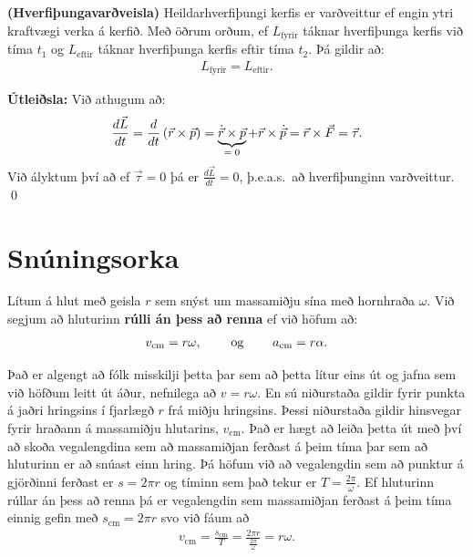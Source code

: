 \begin{tcolorbox}
\begin{theorem}
\textbf{(Hverfiþungavarðveisla)} Heildarhverfiþungi kerfis er varðveittur ef engin ytri kraftvægi verka á kerfið. Með öðrum orðum, ef $L_{\text{fyrir}}$ táknar hverfiþunga kerfis við tíma $t_1$ og $L_{\text{eftir}}$ táknar hverfiþunga kerfis eftir tíma $t_2$. Þá gildir að:
\begin{align*}
    L_{\text{fyrir}} = L_{\text{eftir}}.
\end{align*}
\end{theorem}
\end{tcolorbox}

\textbf{Útleiðsla:} Við athugum að:
\begin{align*}
    \frac{d\vec{L}}{dt} = \frac{d}{dt}\left( \vec{r} \times \vec{p} \right) = \underbrace{\dot{\vec{r}} \times \vec{p}}_\textrm{$=0$} + \vec{r}\times \dot{\vec{p}} = \vec{r}\times \vec{F} = \vec{\tau}.
\end{align*}
Við ályktum því að ef $\vec{\tau} = 0$ þá er $\frac{d\vec{L}}{dt} = 0$, þ.e.a.s.~að hverfiþunginn varðveittur. \qed

\section{Snúningsorka}

\begin{tcolorbox}
\begin{definition}
Lítum á hlut með geisla $r$ sem snýst um massamiðju sína með hornhraða $\omega$. Við segjum að hluturinn \textbf{rúlli án þess að renna} ef við höfum að:
\begin{align*}
    v_{\text{cm}} = r\omega, \hspace{0.8cm} \text{og} \hspace{0.8cm} a_{\text{cm}} = r\alpha.
\end{align*}
\end{definition}
\end{tcolorbox}
Það er algengt að fólk misskilji þetta þar sem að þetta lítur eins út og jafna sem við höfðum leitt út áður, nefnilega að $v = r\omega$. En sú niðurstaða gildir fyrir punkta á jaðri hringsins í fjarlægð $r$ frá miðju hringsins. Þessi niðurstaða gildir hinsvegar fyrir hraðann á massamiðju hlutarins, $v_{\text{cm}}$. Það er hægt að leiða þetta út með því að skoða vegalengdina sem að massamiðjan ferðast á þeim tíma þar sem að hluturinn er að snúast einn hring. Þá höfum við að vegalengdin sem að punktur á gjörðinni ferðast er $s = 2\pi r$ og tíminn sem það tekur er $T = \frac{2\pi}{\omega}$. Ef hluturinn rúllar án þess að renna þá er vegalengdin sem massamiðjan ferðast á þeim tíma einnig gefin með $s_{\text{cm}} = 2\pi r$ svo við fáum að
\begin{align*}
    v_{\text{cm}} = \frac{s_{\text{cm}}}{T} = \frac{2\pi r}{\frac{2\pi}{\omega}} = r \omega.
\end{align*}


